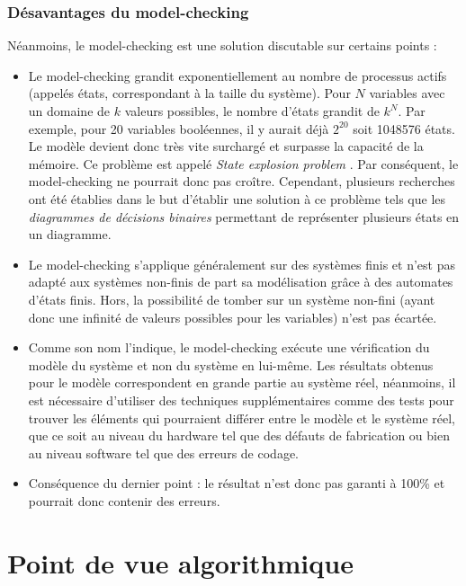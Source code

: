 \documentclass[runningheads,a4paper,10pt]{llncs}
\begin{document}
\subsubsection{Désavantages du model-checking}

Néanmoins, le model-checking est une solution discutable sur certains points : 

\begin{itemize}
\item Le model-checking grandit exponentiellement au nombre de processus actifs (appelés états, correspondant à la taille du système). Pour $N$ variables avec un domaine de $k$ valeurs possibles, le nombre d'états grandit de $k^{N}$. Par exemple, pour 20 variables booléennes, il y aurait déjà $2^{20}$ soit 1048576 états. Le modèle devient donc très vite surchargé et surpasse la capacité de la mémoire. Ce problème est appelé \textit{State explosion problem} \cite{StateExpProb}. Par conséquent, le model-checking ne pourrait donc pas croître. Cependant, plusieurs recherches ont été établies dans le but d'établir une solution à ce problème tels que les \textit{diagrammes de décisions binaires} permettant de représenter plusieurs états en un diagramme. 
\item Le model-checking s'applique généralement sur des systèmes finis et n'est pas adapté aux systèmes non-finis de part sa modélisation grâce à des automates d'états finis. Hors, la possibilité de tomber sur un système non-fini (ayant donc une infinité de valeurs possibles pour les variables) n'est pas écartée. %
\item Comme son nom l'indique, le model-checking exécute une vérification du modèle du système et non du système en lui-même. Les résultats obtenus pour le modèle correspondent en grande partie au système réel, néanmoins, il est nécessaire d'utiliser des techniques supplémentaires comme des tests pour trouver les éléments qui pourraient différer entre le modèle et le système réel, que ce soit au niveau du hardware tel que des défauts de fabrication ou bien au niveau software tel que des erreurs de codage. 
\item Conséquence du dernier point : le résultat n'est donc pas garanti à 100\% et pourrait donc contenir des erreurs. 
\end{itemize}

\section{Point de vue algorithmique}
\end{document}
